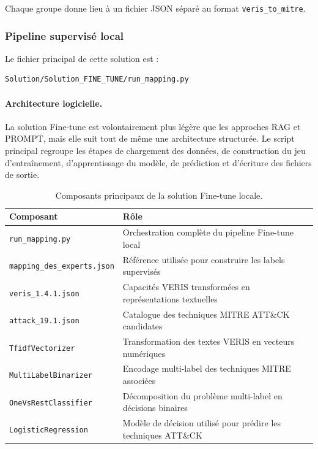 \documentclass[a4paper,12pt]{article}
\begin{document}
Chaque groupe donne lieu à un fichier JSON séparé au format \texttt{veris\_to\_mitre}.

\subsubsection{Pipeline supervisé local}

Le fichier principal de cette solution est :

\begin{verbatim}
Solution/Solution_FINE_TUNE/run_mapping.py
\end{verbatim}

\paragraph{Architecture logicielle.}

La solution Fine-tune est volontairement plus légère que les approches RAG et PROMPT, mais elle suit tout de même une architecture structurée. Le script principal regroupe les étapes de chargement des données, de construction du jeu d'entraînement, d'apprentissage du modèle, de prédiction et d'écriture des fichiers de sortie.

\begin{table}[H]
\centering
\small
\begin{tabular}{l l}
\toprule
\textbf{Composant} & \textbf{Rôle} \\
\midrule
\texttt{run\_mapping.py} & Orchestration complète du pipeline Fine-tune local \\
\texttt{mapping\_des\_experts.json} & Référence utilisée pour construire les labels supervisés \\
\texttt{veris\_1.4.1.json} & Capacités VERIS transformées en représentations textuelles \\
\texttt{attack\_19.1.json} & Catalogue des techniques MITRE ATT\&CK candidates \\
\texttt{TfidfVectorizer} & Transformation des textes VERIS en vecteurs numériques \\
\texttt{MultiLabelBinarizer} & Encodage multi-label des techniques MITRE associées \\
\texttt{OneVsRestClassifier} & Décomposition du problème multi-label en décisions binaires \\
\texttt{LogisticRegression} & Modèle de décision utilisé pour prédire les techniques ATT\&CK \\
\bottomrule
\end{tabular}
\caption{Composants principaux de la solution Fine-tune locale.}
\label{tab:fine-tune-modules}
\end{table}
\end{document}
